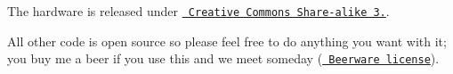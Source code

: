 The hardware is released under \href{http://creativecommons.org/licenses/by-sa/3.0/}{\texttt{ Creative Commons Share-\/alike 3.}}.

All other code is open source so please feel free to do anything you want with it; you buy me a beer if you use this and we meet someday (\href{http://en.wikipedia.org/wiki/Beerware}{\texttt{ Beerware license}}). 